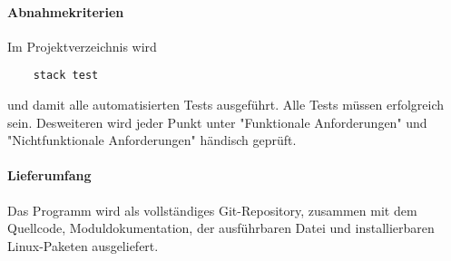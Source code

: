 \paragraph{Abnahmekriterien}
Im Projektverzeichnis wird
\begin{verbatim}
    stack test
\end{verbatim}
und damit alle automatisierten Tests ausgeführt. Alle Tests müssen erfolgreich
sein. Desweiteren wird jeder Punkt unter "Funktionale Anforderungen" und
"Nichtfunktionale Anforderungen" händisch geprüft.

\paragraph{Lieferumfang}
Das Programm wird als vollständiges Git-Repository, zusammen mit dem Quellcode,
Moduldokumentation, der ausführbaren Datei und installierbaren Linux-Paketen
ausgeliefert.